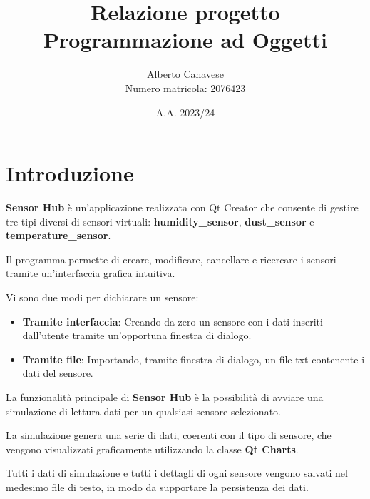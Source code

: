 \documentclass{article}
\title{Relazione progetto Programmazione ad Oggetti}
\author{Alberto Canavese\\Numero matricola: 2076423}
\date{A.A. 2023/24}
\renewcommand{\familydefault}{\rmdefault} %
\begin{document}
    \pretitle{\begin{center}\LARGE}
    \posttitle{\end{center}}
    \preauthor{\begin{center}\large \lineskip 0.5em}
    \postauthor{\end{center}}
    \predate{\begin{center}\large}
    \postdate{\end{center}}
    \maketitle

    \renewcommand{\familydefault}{\sfdefault} %
    \fontsize{10}{12}\selectfont

    \newpage
    \section{Introduzione}
    \textbf{Sensor Hub} è un'applicazione realizzata con Qt Creator che consente di gestire tre tipi
    diversi di sensori virtuali: \textbf{humidity\_sensor}, \textbf{dust\_sensor} e \textbf{temperature\_sensor}.
    
    Il programma permette di creare, modificare, cancellare e ricercare i sensori tramite un'interfaccia
    grafica intuitiva.
        
    Vi sono due modi per dichiarare un sensore:
    \begin{itemize}
        \item \textbf{Tramite interfaccia}: Creando da zero un sensore con i dati inseriti dall'utente tramite un'opportuna finestra di dialogo.
        \item \textbf{Tramite file}: Importando, tramite finestra di dialogo, un file txt contenente i dati del sensore.
    \end{itemize} 
    La funzionalità principale di \textbf{Sensor Hub} è la possibilità di avviare una simulazione di lettura dati per un qualsiasi sensore selezionato. 
    
    La simulazione genera una serie di dati, coerenti con il tipo di sensore, che vengono visualizzati graficamente utilizzando la classe \textbf{Qt Charts}.

    Tutti i dati di simulazione e tutti i dettagli di ogni sensore vengono salvati nel medesimo file di testo, in modo da supportare la persistenza dei dati. 
\end{document}
